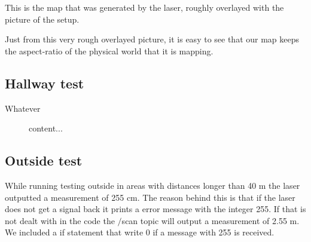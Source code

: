 This is the map that was generated by the laser, roughly overlayed with the picture of the setup.

Just from this very rough overlayed picture, it is easy to see that our map keeps the aspect-ratio of the physical world that it is mapping. 


\subsection{Hallway test}

Whatever

\begin{figure}
	content...
\end{figure}

\subsection{Outside test}
While running testing outside in areas with distances longer than 40 m the laser outputted a measurement of 255 cm. The reason behind this is that if the laser does not get a signal back it prints a error message with the integer 255. If that is not dealt with in the code the $/$scan topic will output a measurement of 2.55 m. We included a if statement that write 0 if a message with 255 is received. 

